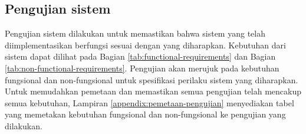 \subsection{Pengujian sistem}
\label{subsection:pengujian-sistem}

Pengujian sistem dilakukan untuk memastikan bahwa sistem yang telah diimplementasikan berfungsi sesuai dengan yang diharapkan. Kebutuhan dari sistem dapat dilihat pada Bagian \ref{tab:functional-requirements} dan Bagian \ref{tab:non-functional-requirements}. Pengujian akan merujuk pada kebutuhan fungsional dan non-fungsional untuk spesifikasi perilaku sistem yang diharapkan. Untuk memudahkan pemetaan dan memastikan semua pengujian telah mencakup semua kebutuhan, Lampiran \ref{appendix:pemetaan-pengujian} menyediakan tabel yang memetakan kebutuhan fungsional dan non-fungsional ke pengujian yang dilakukan.














